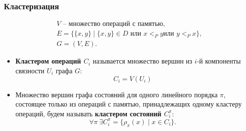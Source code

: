 \begin{frame}
  \frametitle{Кластеризация}

  \begin{equation}
    \label{eq:unorder_set}
    \begin{aligned}
      &V \text{ -- множество операций с памятью,} \\
      &E = \{\{x, y\} \mid \{x, y\} \in D \text{ или } x <_P y \text{
      или } y <_P x \}, \\
      &G = (V, E).
      \nonumber
    \end{aligned}
  \end{equation}

  \begin{itemize}
    \item
      \textbf{Кластером операций $C_{i}$} называется множество вершин из
      $i$-й компоненты связности $U_i$ графа $G$:
      \begin{equation}
        C_{i} = V(U_i)
        \label{def:set_cluster}
        \nonumber
      \end{equation}

    \item

      Множество вершин графа состояний для одного линейного порядка $\pi$,
      состоящее только из операций с памятью, принадлежащих одному
      кластеру операций, будем называть \textbf{кластером состояний
      $C_{i}^{\pi}$}:
      \begin{equation}
        \forall \pi\ \exists C_{i}^{\pi} = \{ \rho_{\pi}(x) \mid x
        \in C_{i}\}.
        \label{def:st_cluster}
        \nonumber
      \end{equation}
  \end{itemize}

\end{frame}

